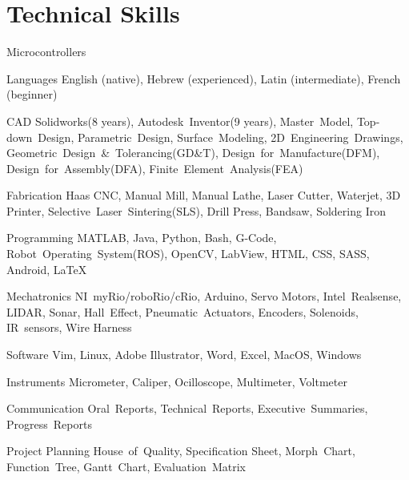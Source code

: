 \documentclass{resume}
\begin{document}
\section{Technical Skills}
\begin{skills}{Microcontrollers}
  \item [Languages] English (native), Hebrew (experienced), Latin (intermediate), French (beginner)
  \item [CAD] Solidworks(8 years), Autodesk~Inventor(9 years), Master~Model, Top-down~Design, Parametric~Design, Surface~Modeling, 2D~Engineering~Drawings, Geometric~Design~\&~Tolerancing(GD\&T), Design~for~Manufacture(DFM), Design~for~Assembly(DFA), Finite~Element~Analysis(FEA)
  \item [Fabrication] Haas CNC, Manual Mill, Manual Lathe, Laser Cutter, Waterjet, 3D Printer, Selective~Laser~Sintering(SLS), Drill Press, Bandsaw, Soldering Iron
  \item [Programming] MATLAB, Java, Python, Bash, G-Code, Robot~Operating~System(ROS), OpenCV, LabView, HTML, CSS, SASS, Android, \LaTeX
  \item [Mechatronics] NI~myRio/roboRio/cRio, Arduino, Servo Motors, Intel~Realsense, LIDAR, Sonar, Hall~Effect, Pneumatic~Actuators, Encoders, Solenoids, IR~sensors, Wire Harness
  \item [Software] Vim, Linux, Adobe Illustrator, Word, Excel, MacOS, Windows
  \item [Instruments] Micrometer, Caliper, Ocilloscope, Multimeter, Voltmeter
  \item [Communication] Oral~Reports, Technical~Reports, Executive~Summaries, Progress~Reports
  \item [Project Planning] House~of~Quality, Specification Sheet, Morph~Chart, Function~Tree, Gantt~Chart, Evaluation~Matrix
\end{skills}
\end{document}
